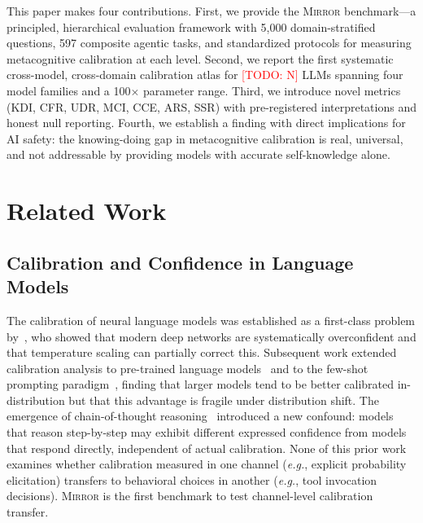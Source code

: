 \documentclass[10pt]{article}
\newcommand{\todo}[1]{\textcolor{red}{[TODO: #1]}}
\newcommand{\mirror}{\textsc{Mirror}}
\newcommand{\eg}{\textit{e.g.}}
\newcommand{\MCI}{MCI}
\newcommand{\CCE}{CCE}
\newcommand{\ARS}{ARS}
\newcommand{\KDI}{KDI}
\newcommand{\CFR}{CFR}
\newcommand{\UDR}{UDR}
\newcommand{\SSR}{SSR}
\begin{document}
This paper makes four contributions. First, we provide the \mirror{} benchmark---a
principled, hierarchical evaluation framework with 5,000 domain-stratified questions,
597 composite agentic tasks, and standardized protocols for measuring metacognitive
calibration at each level. Second, we report the first systematic cross-model,
cross-domain calibration atlas for \todo{N} LLMs spanning four model families and
a 100$\times$ parameter range. Third, we introduce novel metrics (\KDI, \CFR, \UDR,
\MCI, \CCE, \ARS, \SSR) with pre-registered interpretations and honest null reporting.
Fourth, we establish a finding with direct implications for AI safety: the knowing-doing
gap in metacognitive calibration is real, universal, and not addressable by providing
models with accurate self-knowledge alone.

\section{Related Work}
\label{sec:related}

\subsection{Calibration and Confidence in Language Models}

The calibration of neural language models was established as a first-class problem
by~\citet{guo2017calibration}, who showed that modern deep networks are systematically
overconfident and that temperature scaling can partially correct this. Subsequent work
extended calibration analysis to pre-trained language models~\citep{desai2020calibration}
and to the few-shot prompting paradigm~\citep{kadavath2022language}, finding that
larger models tend to be better calibrated in-distribution but that this advantage
is fragile under distribution shift. The emergence of chain-of-thought
reasoning~\citep{wei2022chain} introduced a new confound: models that reason step-by-step
may exhibit different expressed confidence from models that respond directly, independent
of actual calibration. None of this prior work examines whether calibration measured in
one channel (\eg, explicit probability elicitation) transfers to behavioral choices in
another (\eg, tool invocation decisions). \mirror{} is the first benchmark to test
channel-level calibration transfer.
\end{document}
